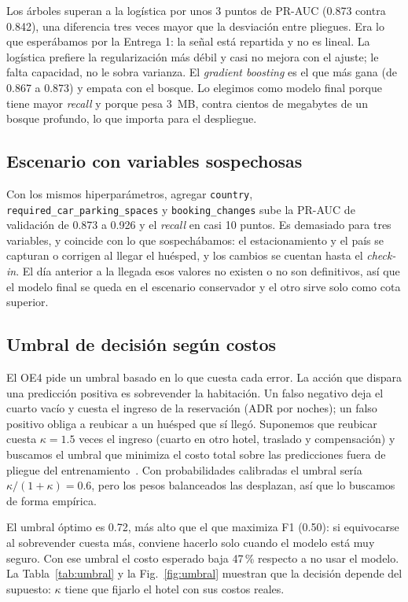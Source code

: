 \documentclass[conference]{IEEEtran}
\begin{document}
Los árboles superan a la logística por unos 3 puntos de PR-AUC (0.873 contra 0.842), una diferencia
tres veces mayor que la desviación entre pliegues. Era lo que esperábamos por la Entrega 1: la
señal está repartida y no es lineal. La logística prefiere la regularización más débil y casi no
mejora con el ajuste; le falta capacidad, no le sobra varianza. El \emph{gradient boosting} es el
que más gana (de 0.867 a 0.873) y empata con el bosque. Lo elegimos como modelo final porque tiene
mayor \emph{recall} y porque pesa 3~MB, contra cientos de megabytes de un bosque profundo, lo que
importa para el despliegue.

\subsection{Escenario con variables sospechosas}

Con los mismos hiperparámetros, agregar \texttt{country}, \texttt{required\_car\_parking\_spaces}
y \texttt{booking\_changes} sube la PR-AUC de validación de 0.873 a 0.926 y el \emph{recall} en casi
10 puntos. Es demasiado para tres variables, y coincide con lo que sospechábamos: el
estacionamiento y el país se capturan o corrigen al llegar el huésped, y los cambios se cuentan
hasta el \emph{check-in}. El día anterior a la llegada esos valores no existen o no son
definitivos, así que el modelo final se queda en el escenario conservador y el otro sirve solo
como cota superior.

\subsection{Umbral de decisión según costos}

El OE4 pide un umbral basado en lo que cuesta cada error. La acción que dispara una predicción
positiva es sobrevender la habitación. Un falso negativo deja el cuarto vacío y cuesta el ingreso
de la reservación (ADR por noches); un falso positivo obliga a reubicar a un huésped que sí llegó.
Suponemos que reubicar cuesta $\kappa = 1.5$ veces el ingreso (cuarto en otro hotel, traslado y
compensación) y buscamos el umbral que minimiza el costo total sobre las predicciones fuera de
pliegue del entrenamiento~\cite{elkan}. Con probabilidades calibradas el umbral sería
$\kappa/(1+\kappa) = 0.6$, pero los pesos balanceados las desplazan, así que lo buscamos de forma
empírica.

El umbral óptimo es 0.72, más alto que el que maximiza F1 (0.50): si equivocarse al sobrevender
cuesta más, conviene hacerlo solo cuando el modelo está muy seguro. Con ese umbral el costo
esperado baja 47\,\% respecto a no usar el modelo. La Tabla~\ref{tab:umbral} y la
Fig.~\ref{fig:umbral} muestran que la decisión depende del supuesto: $\kappa$ tiene que fijarlo el
hotel con sus costos reales.
\end{document}
